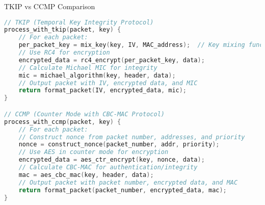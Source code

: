 \begin{examplecode}{TKIP vs CCMP Comparison}\\
\begin{lstlisting}[language=C, style=basesmol]
// TKIP (Temporal Key Integrity Protocol)
process_with_tkip(packet, key) {
    // For each packet:
    per_packet_key = mix_key(key, IV, MAC_address);  // Key mixing function
    // Use RC4 for encryption
    encrypted_data = rc4_encrypt(per_packet_key, data);
    // Calculate Michael MIC for integrity
    mic = michael_algorithm(key, header, data);
    // Output packet with IV, encrypted data, and MIC
    return format_packet(IV, encrypted_data, mic);
}

// CCMP (Counter Mode with CBC-MAC Protocol)
process_with_ccmp(packet, key) {
    // For each packet:
    // Construct nonce from packet number, addresses, and priority
    nonce = construct_nonce(packet_number, addr, priority);
    // Use AES in counter mode for encryption
    encrypted_data = aes_ctr_encrypt(key, nonce, data);
    // Calculate CBC-MAC for authentication/integrity
    mac = aes_cbc_mac(key, header, data);
    // Output packet with packet number, encrypted data, and MAC
    return format_packet(packet_number, encrypted_data, mac);
}
\end{lstlisting}
\end{examplecode}

